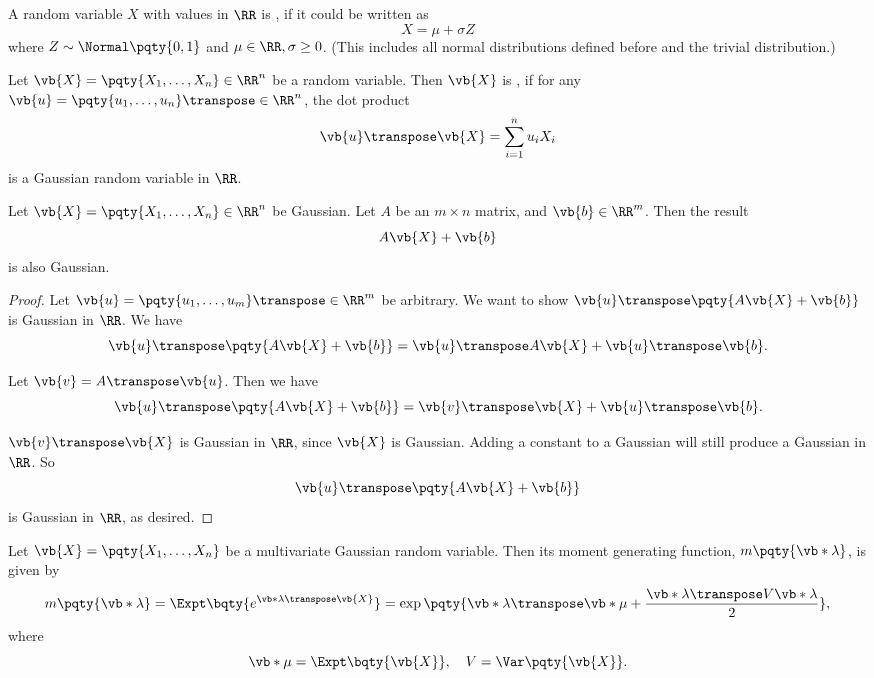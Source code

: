 \begin{definition}
    \label{def:multivariate-gaussian-rv}%
    A random variable \(X\) with values in \(\RR\) is , if it could be written as
    \[
        X = \mu + \sigma Z
    \]
    where \(Z \sim \Normal\pqty{0, 1}\) and \(\mu \in \RR, \sigma \geq 0\). (This includes all normal distributions defined before and the trivial distribution.)

    Let \(\vb{X} = \pqty{X_1, \ldots, X_n} \in \RR^n\) be a random variable. Then \(\vb{X}\) is , if for any \(\vb{u} = \pqty{u_1, \ldots, u_n}\transpose \in \RR^n\), the dot product
    \[
        \vb{u}\transpose \vb{X} = \sum_{i = 1}^{n} u_i X_i
    \]
    is a Gaussian random variable in \(\RR\).
\end{definition}

\begin{claim}
    \label{claim:affine-transformation-preserves-gaussian}%
    Let \(\vb{X} = \pqty{X_1, \ldots, X_n} \in \RR^n\) be Gaussian. Let \(A\) be an \(m \times n\) matrix, and \(\vb{b} \in \RR^m\). Then the result
    \[
        A \vb{X} + \vb{b}
    \]
    is also Gaussian.
\end{claim}

\begin{proof}
    Let \(\vb{u} = \pqty{u_1, \ldots, u_m} \transpose \in \RR^m\) be arbitrary. We want to show \(\vb{u}\transpose \pqty{A \vb{X} + \vb{b}}\) is Gaussian in \(\RR\). We have
    \[
        \vb{u}\transpose \pqty{A \vb{X} + \vb{b}} = \vb{u}\transpose A \vb{X} + \vb{u}\transpose \vb{b}.
    \]

    Let \(\vb{v} = A\transpose \vb{u}\). Then we have
    \[
        \vb{u}\transpose \pqty{A \vb{X} + \vb{b}} = \vb{v}\transpose \vb{X} + \vb{u}\transpose \vb{b}.
    \]

    \(\vb{v}\transpose \vb{X}\) is Gaussian in \(\RR\), since \(\vb{X}\) is Gaussian. Adding a constant to a Gaussian will still produce a Gaussian in \(\RR\). So
    \[
        \vb{u}\transpose \pqty{A \vb{X} + \vb{b}}
    \]
    is Gaussian in \(\RR\), as desired.
\end{proof}

\begin{proposition}
    \label{prop:mgf-multivariate-gaussian}%
    Let \(\vb{X} = \pqty{X_1, \ldots, X_n}\) be a multivariate Gaussian random variable. Then its moment generating function, \(m\pqty{\vb*{\lambda}}\), is given by
    \[
        m\pqty{\vb*{\lambda}} = \Expt\bqty{e^{\vb*{\lambda} \transpose \vb{X}}} = \exp\pqty{\vb*{\lambda} \transpose \vb*{\mu} + \frac{\vb*{\lambda} \transpose V \vb*{\lambda}}{2}},
    \]
    where
    \[
        \vb*{\mu} = \Expt\bqty{\vb{X}}, \quad V = \Var\pqty{\vb{X}}.
    \]
\end{proposition}

